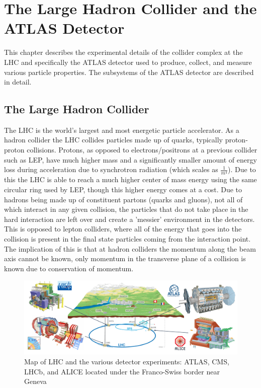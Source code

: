 
\chapter{The Large Hadron Collider and the ATLAS Detector}
\label{ch:LHCDetector}

This chapter describes the experimental details of the collider complex at the LHC and specifically the ATLAS detector used to produce, collect, and measure various particle properties.  The subsystems of the ATLAS detector are described in detail.
\section{The Large Hadron Collider}
\label{Section:LHC}
The LHC is the world's largest and most energetic particle accelerator.  As a hadron collider the LHC collides particles made up of quarks, typically proton-proton collisions.  Protons, as opposed to electrons/positrons at a previous collider such as LEP, have much higher mass and a significantly smaller amount of energy loss during acceleration due to synchrotron radiation (which scales as $\frac{1}{m^4}$).  Due to this the LHC is able to reach a much higher center of mass energy using the same circular ring used by LEP, though this higher energy comes at a cost.  Due to hadrons being made up of constituent partons (quarks and gluons), not all of which interact in any given collision, the particles that do not take place in the hard interaction are left over and create a 'messier' environment in the detectors.  This is opposed to lepton colliders, where all of the energy that goes into the collision is present in the final state particles coming from the interaction point.  The implication of this is that at hadron colliders the momentum along the beam axis cannot be known, only momentum in the transverse plane of a collision is known due to conservation of momentum.

\begin{figure}[h!]
	\centering
	\includegraphics[width=\columnwidth]{../ThesisImages/LHCImages/LHCDetecPlacement.png}
	\caption[Map of LHC and the various detector experiments: ATLAS, CMS, LHCb, and ALICE located under the Franco-Swiss border near Geneva]{Map of LHC and the various detector experiments: ATLAS, CMS, LHCb, and ALICE  located under the Franco-Swiss border near Geneva\cite{ATLASCoords}}
	\label{fig:LHCDetPlace}
\end{figure}

